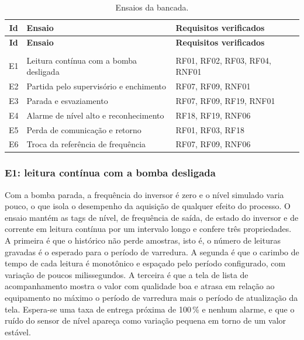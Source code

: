{\renewcommand{\arraystretch}{1.3}\small
\begin{xltabular}{\textwidth}{cXX}
        \caption{Ensaios da bancada.}
        \label{tab:cap7_ensaios}\\
        \hline
        \textbf{Id} & \textbf{Ensaio} & \textbf{Requisitos verificados} \\
        \hline
        \endfirsthead
        \hline
        \textbf{Id} & \textbf{Ensaio} & \textbf{Requisitos verificados} \\
        \hline
        \endhead
        \endfoot
         \\
        \endlastfoot
        E1 & Leitura contínua com a bomba desligada & RF01, RF02, RF03, RF04, RNF01 \\
        \hline
        E2 & Partida pelo supervisório e enchimento & RF07, RF09, RNF01 \\
        \hline
        E3 & Parada e esvaziamento & RF07, RF09, RF19, RNF01 \\
        \hline
        E4 & Alarme de nível alto e reconhecimento & RF18, RF19, RNF06 \\
        \hline
        E5 & Perda de comunicação e retorno & RF01, RF03, RF18 \\
        \hline
        E6 & Troca da referência de frequência & RF07, RF09, RNF06 \\
        \hline
\end{xltabular}}

\subsubsection{E1: leitura contínua com a bomba desligada}

\par Com a bomba parada, a frequência do inversor é zero e o nível simulado varia pouco, o que isola o desempenho da aquisição de qualquer efeito do processo. O ensaio mantém as tags de nível, de frequência de saída, de estado do inversor e de corrente em leitura contínua por um intervalo longo e confere três propriedades. A primeira é que o histórico não perde amostras, isto é, o número de leituras gravadas é o esperado para o período de varredura. A segunda é que o carimbo de tempo de cada leitura é monotônico e espaçado pelo período configurado, com variação de poucos milissegundos. A terceira é que a tela de lista de acompanhamento mostra o valor com qualidade boa e atrasa em relação ao equipamento no máximo o período de varredura mais o período de atualização da tela. Espera-se uma taxa de entrega próxima de 100\,\% e nenhum alarme, e que o ruído do sensor de nível apareça como variação pequena em torno de um valor estável.

